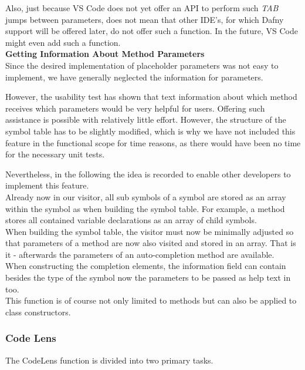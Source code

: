 Also, just because VS Code does not yet offer an API to perform such \textit{TAB} jumps between parameters,
does not mean that other IDE's, for which Dafny support will be offered later,
do not offer such a function.
In the future, VS Code might even add such a function. \\

\textbf{Getting Information About Method Parameters} \\
Since the desired implementation of placeholder parameters was not easy to implement,
we have generally neglected the information for parameters.

However, the usability test has shown that text information about which method
receives which parameters would be very helpful for users.
Offering such assistance is possible with relatively little effort.
However, the structure of the symbol table has to be slightly modified,
which is why we have not included this feature in the functional scope for time reasons,
as there would have been no time for the necessary unit tests.

Nevertheless, in the following the idea is recorded to enable other developers to implement this feature.\\

Already now in our visitor, all sub symbols of a symbol are stored as an array within the symbol
as  when building the symbol table.
For example, a method stores all contained variable declarations as an array of child symbols. \\

When building the symbol table,
the visitor must now be minimally adjusted so that parameters
of a method are now also visited and stored in an array.
That is it - afterwards the parameters of an auto-completion method are available. \\

When constructing the completion elements,
the information field  can contain besides
the type of the symbol now the parameters to be passed as help text in  too. \\

This function is of course not only limited to methods but can also be applied to class constructors.

\subsubsection{Code Lens}
The CodeLens function is divided into two primary tasks.

